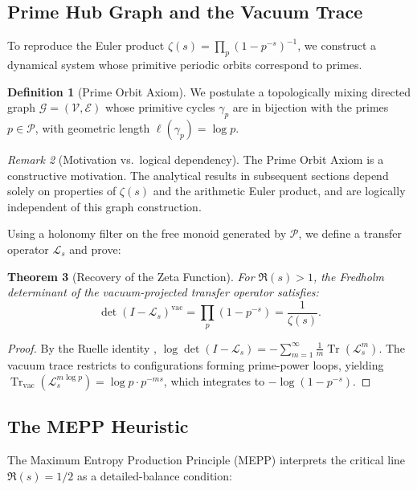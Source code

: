 \documentclass[12pt,a4paper]{article}
\newtheorem{theorem}{Theorem}[section]
\theoremstyle{definition}
\newtheorem{definition}[theorem]{Definition}
\theoremstyle{remark}
\newtheorem{remark}[theorem]{Remark}
\newcommand{\PP}{\mathcal{P}}
\begin{document}
\subsection{Prime Hub Graph and the Vacuum Trace}

To reproduce the Euler product $\zeta(s) = \prod_p (1-p^{-s})^{-1}$, we construct a dynamical system whose primitive periodic orbits correspond to primes.

\begin{definition}[Prime Orbit Axiom]
We postulate a topologically mixing directed graph $\mathcal{G} = (\mathcal{V}, \mathcal{E})$ whose primitive cycles $\gamma_p$ are in bijection with the primes $p \in \PP$, with geometric length $\ell(\gamma_p) = \log p$.
\end{definition}

\begin{remark}[Motivation vs.\ logical dependency]
The Prime Orbit Axiom is a constructive motivation. The analytical results in subsequent sections depend solely on properties of $\zeta(s)$ and the arithmetic Euler product, and are logically independent of this graph construction.
\end{remark}

Using a holonomy filter on the free monoid generated by $\PP$, we define a transfer operator $\mathcal{L}_s$ and prove:

\begin{theorem}[Recovery of the Zeta Function]
\label{thm:vacuum-trace}
For $\Re(s) > 1$, the Fredholm determinant of the vacuum-projected transfer operator satisfies:
\[
\det(I - \mathcal{L}_s)^{\mathrm{vac}} = \prod_p (1 - p^{-s}) = \frac{1}{\zeta(s)}.
\]
\end{theorem}

\begin{proof}
By the Ruelle identity \cite{Ruelle1976}, $\log\det(I - \mathcal{L}_s) = -\sum_{m=1}^\infty \frac{1}{m}\operatorname{Tr}(\mathcal{L}_s^m)$. The vacuum trace restricts to configurations forming prime-power loops, yielding $\operatorname{Tr}_{\mathrm{vac}}(\mathcal{L}_s^{m\log p}) = \log p \cdot p^{-ms}$, which integrates to $-\log(1-p^{-s})$.
\end{proof}

\subsection{The MEPP Heuristic}

The Maximum Entropy Production Principle (MEPP) interprets the critical line $\Re(s) = 1/2$ as a detailed-balance condition:
\end{document}
